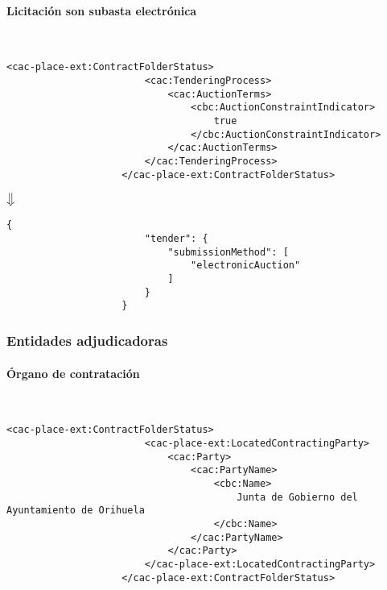             \paragraph{Licitación son subasta electrónica} \mbox{}\\
                \begin{lstlisting}[language=lXML]
                    <cac-place-ext:ContractFolderStatus>
                        <cac:TenderingProcess>
                            <cac:AuctionTerms>
                                <cbc:AuctionConstraintIndicator>
                                    true
                                </cbc:AuctionConstraintIndicator>
                            </cac:AuctionTerms>
                        </cac:TenderingProcess>
                    </cac-place-ext:ContractFolderStatus>
                \end{lstlisting}
                
                \begin{center}
                    $\big\Downarrow$
                \end{center}
                
                \begin{lstlisting}[language=lJSON]
                    {
                        "tender": {
                            "submissionMethod": [
                                "electronicAuction"
                            ]
                        }
                    }
                \end{lstlisting}
        
        \subsubsection{Entidades adjudicadoras}
            \paragraph{Órgano de contratación} \mbox{}\\
                \begin{lstlisting}[language=lXML]
                    <cac-place-ext:ContractFolderStatus>
                        <cac-place-ext:LocatedContractingParty>
                            <cac:Party>
                                <cac:PartyName>
                                    <cbc:Name>
                                        Junta de Gobierno del Ayuntamiento de Orihuela
                                    </cbc:Name>
                                </cac:PartyName>
                            </cac:Party>
                        </cac-place-ext:LocatedContractingParty>
                    </cac-place-ext:ContractFolderStatus>
                \end{lstlisting}
                
